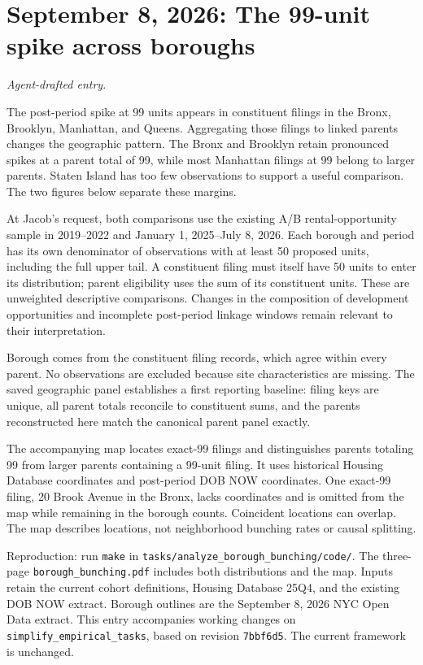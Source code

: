 \clearpage
\section*{September 8, 2026: The 99-unit spike across boroughs}
\textit{Agent-drafted entry.}

The post-period spike at 99 units appears in constituent filings in the Bronx,
Brooklyn, Manhattan, and Queens. Aggregating those filings to linked parents
changes the geographic pattern. The Bronx and Brooklyn retain pronounced spikes
at a parent total of 99, while most Manhattan filings at 99 belong to larger
parents. Staten Island has too few observations to support a useful comparison.
The two figures below separate these margins.

At Jacob's request, both comparisons use the existing A/B rental-opportunity
sample in 2019--2022 and January 1, 2025--July 8, 2026. Each borough and period
has its own denominator of observations with at least 50 proposed units,
including the full upper tail. A constituent filing must itself have 50 units
to enter its distribution; parent eligibility uses the sum of its constituent
units. These are unweighted descriptive comparisons. Changes in the composition
of development opportunities and incomplete post-period linkage windows remain
relevant to their interpretation.

Borough comes from the constituent filing records, which agree within every
parent. No observations are excluded because site characteristics are missing.
The saved geographic panel establishes a first reporting baseline: filing keys
are unique, all parent totals reconcile to constituent sums, and the parents
reconstructed here match the canonical parent panel exactly.

The accompanying map locates exact-99 filings and distinguishes parents totaling
99 from larger parents containing a 99-unit filing. It uses historical Housing
Database coordinates and post-period DOB NOW coordinates. One exact-99 filing,
20 Brook Avenue in the Bronx, lacks coordinates and is omitted from the map
while remaining in the borough counts. Coincident locations can overlap. The
map describes locations, not neighborhood bunching rates or causal splitting.

\smallskip
{\small Reproduction: run \texttt{make} in
\texttt{tasks/analyze\_borough\_bunching/code/}. The three-page
\texttt{borough\_bunching.pdf} includes both distributions and the map.
Inputs retain the current cohort definitions, Housing Database 25Q4, and the
existing DOB NOW extract. Borough outlines are the September 8, 2026 NYC Open
Data extract. This entry accompanies working changes on
\texttt{simplify\_empirical\_tasks}, based on revision \texttt{7bbf6d5}.
The current framework is unchanged.}

